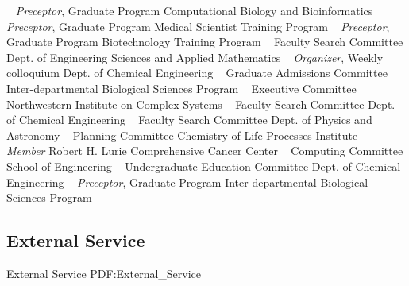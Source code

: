 ~
\Gap
{}
\textit{Preceptor}, Graduate Program\newline
Computational Biology and Bioinformatics \newline
~
\Gap
{}
\textit{Preceptor}, Graduate Program\newline
Medical Scientist Training Program \newline
~
\Gap
{}
\textit{Preceptor}, Graduate Program\newline
Biotechnology Training Program \newline
~
\Gap
{}
Faculty Search Committee\newline
Dept. of Engineering Sciences and Applied Mathematics  \newline
~
\Gap
{}
\textit{Organizer}, Weekly colloquium\newline
Dept. of Chemical Engineering \newline
~
\Gap
{}
Graduate Admissions Committee\newline
Inter-departmental Biological Sciences Program \newline
~
\Gap
{}
Executive Committee\newline
Northwestern Institute on Complex Systems \newline
~
\Gap
{}
Faculty Search Committee\newline
Dept. of Chemical Engineering \newline
~
\Gap
{}
Faculty Search Committee\newline
Dept. of Physics and Astronomy \newline
~
\Gap
{}
Planning Committee\newline
Chemistry of Life Processes Institute \newline
~
\Gap
{}
\textit{Member}
Robert H. Lurie Comprehensive Cancer Center \newline
~
\Gap
{}
Computing Committee\newline
School of Engineering \newline
~
\Gap
{}
Undergraduate Education Committee\newline
Dept. of Chemical Engineering \newline
~
\Gap
{}
\textit{Preceptor}, Graduate Program\newline
Inter-departmental Biological Sciences Program \newline
~
\Gap
\vspace*{0.2cm}\subsection
{External Service}
{External Service}
{PDF:External_Service}

